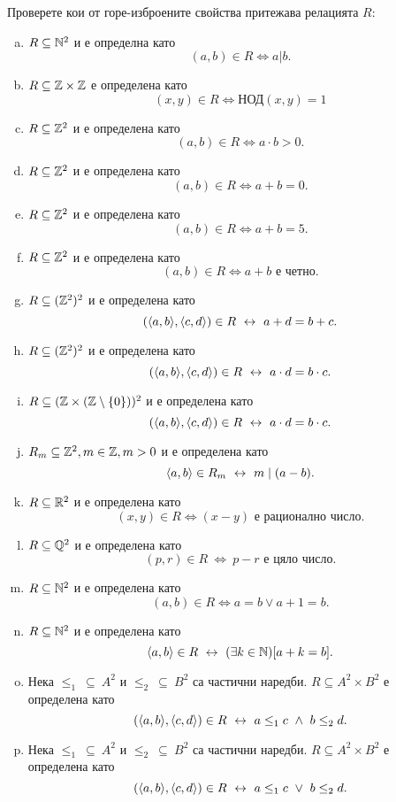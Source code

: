 \begin{problem}
  Проверете кои от горе-изброените свойства притежава релацията $R$:
  \begin{enumerate}[a)]
  \item
    $R\subseteq \mathbb{N}^2$ и е определна като 
    \[(a,b) \in R \iff a | b.\]
  \item
    $R \subseteq \mathbb{Z}\times \mathbb{Z}$ е определена като
    \[(x,y)\in R \iff \mbox{НОД}(x,y) = 1\]%
  \item
    $R\subseteq \mathbb{Z}^2$ и е определена като
    \[(a,b) \in R \iff a\cdot b > 0.\]
  \item
    $R\subseteq \mathbb{Z}^2$ и е определена като 
    \[(a,b) \in R \iff a+b = 0.\]
  \item
    $R\subseteq \mathbb{Z}^2$ и е определена като
    \[(a,b) \in R \iff a+b = 5.\]
  \item
    $R\subseteq \mathbb{Z}^2$ и е определена като 
    \[(a,b) \in R \iff a+b\mbox{ е четно}.\]
  \item
    $R\subseteq (\mathbb{Z}^2)^2$ и е определена като
    \[(\langle{a,b}\rangle, \langle{c,d}\rangle) \in R \ \leftrightarrow\  a+d = b+c.\]
  \item
    $R\subseteq (\mathbb{Z}^2)^2$ и е определена като
    \[(\langle{a,b}\rangle,\langle{c,d}\rangle) \in R \ \leftrightarrow\  a\cdot d = b\cdot c.\]
  \item
    $R\subseteq (\mathbb{Z}\times (\mathbb{Z}\setminus\{0\}))^2$ и е определена като
    \[(\langle{a,b}\rangle,\langle{c,d}\rangle) \in R \ \leftrightarrow\  a\cdot d = b\cdot c.\]
  \item
    $R_{m}\subseteq \mathbb{Z}^2, m\in \mathbb{Z}, m>0$ и е определена като
    \[\langle{a,b}\rangle \in R_m \ \leftrightarrow\  m\mid (a - b).\]
  \item
    $R\subseteq \mathbb{R}^2$ и е определена като 
    \[(x,y) \in R \iff (x-y)\mbox{ е рационално число}.\]
  \item
    $R \subseteq \mathbb{Q}^2$ и е определена като
    \[(p,r) \in R\ \iff\ p-r \mbox{ е цяло число}.\]
  \item
    $R \subseteq \mathbb{N}^2$ и е определена като
    \[(a,b) \in R \iff a = b \vee a+1 = b.\]
  \item
    $R \subseteq \mathbb{N}^2$ и е определена като
    \[\langle{a,b}\rangle\in R \ \leftrightarrow\  (\exists k\in\mathbb{N})[a+k = b].\]
  \item
    Нека $\leq_1\ \subseteq\ A^2$ и $\leq_2\ \subseteq\ B^2$ са частични наредби.
    $R \subseteq A^2\times B^2$ е определена като
    \[(\langle{a,b}\rangle, \langle{c,d}\rangle) \in R \ \leftrightarrow\  a\leq_{1}c\ \wedge\ b\leq_{2}d .\]
  \item
    Нека $\leq_1\ \subseteq\ A^2$ и $\leq_2\ \subseteq\ B^2$ са частични наредби.
    $R \subseteq A^2\times B^2$ е определена като
    \[(\langle{a,b}\rangle, \langle{c,d}\rangle) \in R \ \leftrightarrow\  a\leq_{1}c\ \vee\ b\leq_{2}d .\]

  \end{enumerate}
\end{problem}

